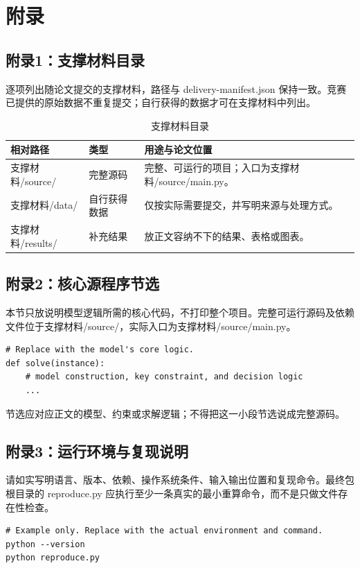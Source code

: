 
\makeatletter
\let\@oldaddcontentsline\addcontentsline
\renewcommand{\addcontentsline}[3]{}
\section*{附录}
\label{sec:appendix}
\let\addcontentsline\@oldaddcontentsline
\makeatother

\subsection*{附录1：支撑材料目录}
\label{app:support-files}

逐项列出随论文提交的支撑材料，路径与 delivery-manifest.json 保持一致。竞赛已提供的原始数据不重复提交；自行获得的数据才可在支撑材料中列出。

\begin{table}[H]
  \centering
  \caption{支撑材料目录}
  \label{tab:appendix_files}
  \renewcommand{\arraystretch}{1.2}
  \begin{tabularx}{\textwidth}{LXX}
    \toprule
    相对路径 & 类型 & 用途与论文位置 \\
    \midrule
    支撑材料/source/ & 完整源码 & 完整、可运行的项目；入口为支撑材料/source/main.py。 \\
    支撑材料/data/ & 自行获得数据 & 仅按实际需要提交，并写明来源与处理方式。 \\
    支撑材料/results/ & 补充结果 & 放正文容纳不下的结果、表格或图表。 \\
    \bottomrule
  \end{tabularx}
\end{table}

\subsection*{附录2：核心源程序节选}
\label{app:core-code}

本节只放说明模型逻辑所需的核心代码，不打印整个项目。完整可运行源码及依赖文件位于支撑材料/source/，实际入口为支撑材料/source/main.py。

\begin{verbatim}
# Replace with the model's core logic.
def solve(instance):
    # model construction, key constraint, and decision logic
    ...
\end{verbatim}

节选应对应正文的模型、约束或求解逻辑；不得把这一小段节选说成完整源码。

\subsection*{附录3：运行环境与复现说明}
\label{app:reproduction}

请如实写明语言、版本、依赖、操作系统条件、输入输出位置和复现命令。最终包根目录的 reproduce.py 应执行至少一条真实的最小重算命令，而不是只做文件存在性检查。

\begin{verbatim}
# Example only. Replace with the actual environment and command.
python --version
python reproduce.py
\end{verbatim}
